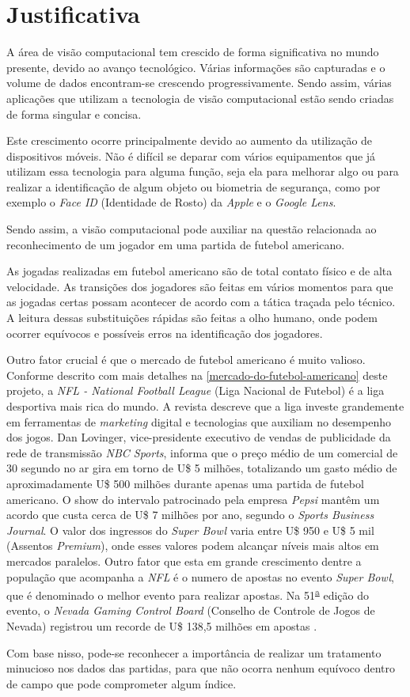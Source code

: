 \section{\textbf{Justificativa}}

A área de visão computacional tem crescido de forma significativa no mundo presente, devido ao avanço tecnológico. Várias informações são capturadas e o volume de dados encontram-se crescendo progressivamente. Sendo assim, várias aplicações que utilizam a tecnologia de visão computacional estão sendo criadas de forma singular e concisa.

Este crescimento ocorre principalmente devido ao aumento da utilização de dispositivos móveis. Não é difícil se deparar com vários equipamentos que já utilizam essa tecnologia para alguma função, seja ela para melhorar algo ou para realizar a identificação de algum objeto ou biometria de segurança, como por exemplo o \textit{Face ID} (Identidade de Rosto) da \textit{Apple} e o \textit{Google Lens}.

Sendo assim, a visão computacional pode auxiliar na questão relacionada ao reconhecimento de um jogador em uma partida de futebol americano.

As jogadas realizadas em futebol americano são de total contato físico e de alta velocidade. As transições dos jogadores são feitas em vários momentos para que as jogadas certas possam acontecer de acordo com a tática traçada pelo técnico. A leitura dessas substituições rápidas são feitas a olho humano, onde podem ocorrer equívocos e possíveis erros na identificação dos jogadores.

Outro fator crucial é que o mercado de futebol americano é muito valioso. Conforme descrito com mais detalhes na \autoref{mercado-do-futebol-americano} deste projeto, a \textit{NFL - National Football League} (Liga Nacional de Futebol) é a liga desportiva mais rica do mundo. A revista  descreve que a liga investe grandemente em ferramentas de \textit{marketing} digital e tecnologias que auxiliam no desempenho dos jogos. Dan Lovinger, vice-presidente executivo de vendas de publicidade da rede de transmissão \textit{NBC Sports}, informa que o preço médio de um comercial de 30 segundo no ar gira em torno de U\$ 5 milhões, totalizando um gasto médio de aproximadamente U\$ 500 milhões durante apenas uma partida de futebol americano. O show do intervalo patrocinado pela empresa \textit{Pepsi} mantêm um acordo que custa cerca de U\$ 7 milhões por ano, segundo o \textit{Sports Business Journal}. O valor dos ingressos do \textit{Super Bowl} varia entre U\$ 950 e U\$ 5 mil (Assentos \textit{Premium}), onde esses valores podem alcançar níveis mais altos em mercados paralelos. Outro fator que esta em grande crescimento dentre a população que acompanha a \textit{NFL} é o numero de apostas no evento \textit{Super Bowl}, que é denominado o melhor evento para realizar apostas. Na 51\textsuperscript{\underline{a}} edição do evento, o \textit{Nevada Gaming Control Board} (Conselho de Controle de Jogos de Nevada) registrou um recorde de U\$ 138,5 milhões em apostas \cite{FORBES2018}.

Com base nisso, pode-se reconhecer a importância de realizar um tratamento minucioso nos dados das partidas, para que não ocorra nenhum equívoco dentro de campo que pode comprometer algum índice.